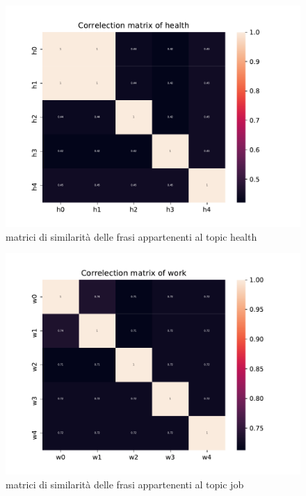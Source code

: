\begin{figure}[h!t]
    \centering
    \includegraphics{Figure/simMatr/health.pdf}
    \caption{matrici di similarità delle frasi appartenenti al topic health}
    \label{fig:mtrsim_h}
\end{figure}
\FloatBarrier

\begin{figure}[h!t]
    \centering
    \includegraphics{Figure/simMatr/work.pdf}
    \caption{matrici di similarità delle frasi appartenenti al topic job}
    \label{fig:mtrsim_j}
\end{figure}
\FloatBarrier

